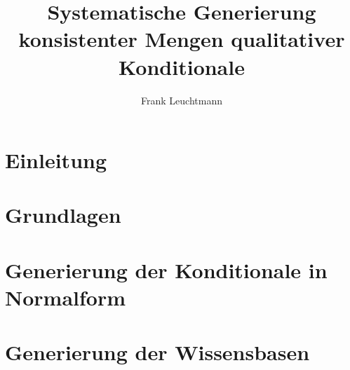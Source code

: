 \documentclass[12pt,a4paper]{article}
\author{Frank Leuchtmann}
\title{Systematische Generierung konsistenter Mengen qualitativer
Konditionale}
\begin{document}
\maketitle
\newpage

\section{Einleitung}
\section{Grundlagen}
\section{Generierung der Konditionale in Normalform}
\section{Generierung der Wissensbasen}
\end{document}
